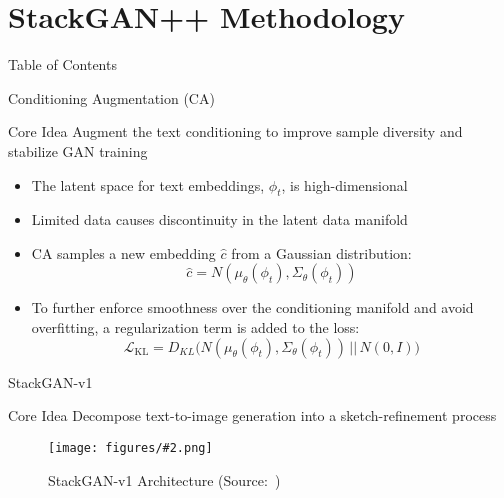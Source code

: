 \documentclass{beamer}
\newcommand{\paperfigure}[3][width=\textwidth]{%
    \begin{figure}%
        \centering%
        \texttt{[image: figures/\#2.png]}%
        \caption{#3 (Source:~\cite{stackgan++})}%
    \end{figure}%
}
\begin{document}
\section{StackGAN++ Methodology}
\begin{frame}{Table of Contents}
    \tableofcontents[currentsection]
\end{frame}

\begin{frame}{Conditioning Augmentation (CA)}
    \centering
    \begin{minipage}{0.8\textwidth}
        \begin{block}{Core Idea}
            \centering
            Augment the text conditioning to improve sample diversity and stabilize GAN training
        \end{block}
    \end{minipage}
    \vspace{1em}
    \begin{itemize}
        \item The latent space for text embeddings, $\phi_t$, is high-dimensional
        \item Limited data causes discontinuity in the latent data manifold
        \item CA samples a new embedding $\hat{c}$ from a Gaussian distribution:
        \[
        \hat{c} = N(\mu_\theta(\phi_t), \Sigma_\theta(\phi_t))
        \]
        \item To further enforce smoothness over the conditioning manifold and avoid overﬁtting, a regularization term is added to the loss:
        \[
        \mathcal{L}_{\text{KL}} = D_{KL}\big(N(\mu_\theta(\phi_t), \Sigma_\theta(\phi_t))\, ||\, N(0, I)\big)
        \]
    \end{itemize}  
\end{frame}


\begin{frame}{StackGAN-v1}
    \centering
    \begin{minipage}{0.8\textwidth}
        \begin{block}{Core Idea}
            \centering
            Decompose text-to-image generation into a sketch-refinement process
        \end{block}
    \end{minipage}
    \paperfigure[width=0.9\textwidth]{stackgan_v1}{StackGAN-v1 Architecture}
\end{frame}
\end{document}

